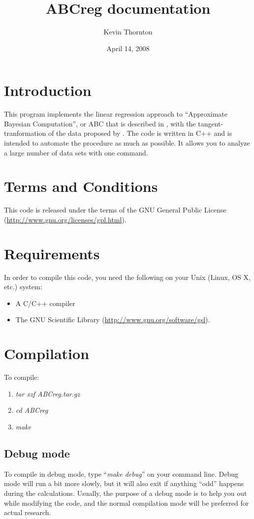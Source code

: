 \documentclass{article}
\title{ABCreg documentation}
\author{Kevin Thornton}
\date{April 14, 2008}
\begin{document}
\maketitle

\section*{Introduction}
This program implements the linear regression approach to ``Approximate Bayesian Computation'', or ABC that is described in \cite{beaumont02ABC}, with the tangent-tranformation of the data proposed by \cite{hamilton.abc.2005}.  The code is written in C++ and is intended to automate the procedure as much as possible.  It allows you to analyze a large number of data sets with one command.

\section*{Terms and Conditions}
This code is released under the terms of the GNU General Public License (\url{http://www.gnu.org/licenses/gpl.html}).

\section*{Requirements}
In order to compile this code, you need the following on your Unix (Linux, OS X, etc.) system:
\begin{itemize}
\item A C/C++ compiler
\item The GNU Scientific Library (\url{http://www.gnu.org/software/gsl}).
\end{itemize}

\section*{Compilation}
To compile:
\begin{enumerate}
\item \textit{tar xzf ABCreg.tar.gz}
\item \textit{cd ABCreg}
\item \textit{make}
\end{enumerate}

\subsection*{Debug mode}
To compile in debug mode, type ``\textit{make debug}'' on your command line.  Debug mode will run a bit more slowly, but it will also exit if anything ``odd'' happens during the calculations.  Usually, the purpose of a debug mode is to help you out while modifying the code, and the normal compilation mode will be preferred for actual research.
\end{document}
